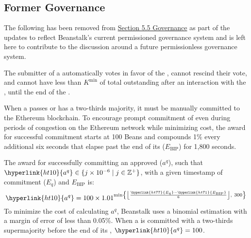 \documentclass[class=article, crop=false]{standalone}
\begin{document}
\subsection{Former Governance}
The following has been removed from \hyperlink{subsection.5.5}{Section 5.5 Governance} as part of the updates to reflect Beanstalk's current permissioned governance system and is left here to contribute to the discussion around a future permissionless governance system. 

The submitter of a  automatically votes in favor of the , cannot rescind their vote, and cannot have less than \hyperlink{ht119}{$K^{\text{min}}$} of total outstanding  after an interaction with the , until the end of the .

When a  passes or has a two-thirds majority, it must be manually committed to the Ethereum blockchain. To encourage prompt commitment of  even during periods of congestion on the Ethereum network while minimizing cost, the award for successful commitment starts at 100 Beans and compounds 1\% every additional six seconds that elapse past the end of its  (\hyperlink{ht71}{$E_{\text{BIP}}$}) for 1,800 seconds.

The award for successfully committing an approved  (\hyperlink{ht10}{$a^q$}), such that $\hyperlink{ht10}{a^q} \in \{j \times 10^{-6} \mid j \in \mathbb{Z}^{+} \}$, with a given timestamp of commitment (\hyperlink{ht77}{$E_q$}) and \hyperlink{ht71}{$E_{\text{BIP}}$} is:
$$\hyperlink{ht10}{a^q} = 100 \times 1.01^{\text{min}\left\{\left\lfloor\frac{\hyperlink{ht77}{E_q} - \hyperlink{ht71}{E_{\text{BIP}}}}{6}\right\rfloor,\ 300\right\}}$$
To minimize the cost of calculating \hyperlink{ht10}{$a^q$}, Beanstalk uses a binomial estimation with a margin of error of less than 0.05\%. When a  is committed with a two-thirds supermajority before the end of its , $\hyperlink{ht10}{a^q} = 100$.
\end{document}
